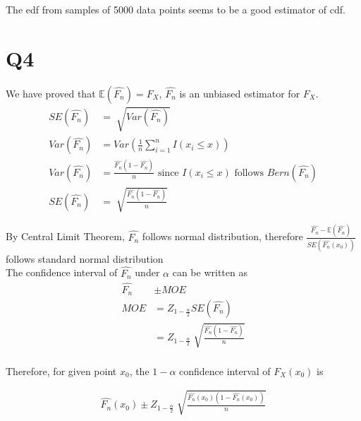 \documentclass[12pt,letterpaper]{article}
\let\hat\widehat
\begin{document}
\noindent The edf from samples of 5000 data points seems to be a good estimator of cdf.

\pagebreak
\section*{Q4}
We have proved that $\mathbb{E}(\hat{F_n}) = F_X$, $\hat{F_n}$ is an unbiased estimator for $F_X$. \\
\begin{align*}
SE(\hat{F_n}) &= \sqrt[]{ Var(\hat{F_n})} \\
Var(\hat{F_n}) &= Var(\frac{1}{n} \sum_{i=1}^{n} I(x_i \leq x)) \\
Var(\hat{F_n}) &= \frac{\hat{F_n }(1 - \hat{F_n})}{n} \text{ since } I(x_i \leq x) \text{ follows } Bern(\hat{F_n}) \\
SE(\hat{F_n}) &= \sqrt[]{\frac{\hat{F_n} (1 - \hat{F_n})}{n}}
\end{align*}

\noindent By Central Limit Theorem, $\hat{F_n}$ follows normal distribution, therefore 
$\frac{\hat{F_n} - \mathbb{E}(\hat{F_n}) }{SE(\hat{F_n}(x_0))}$ follows standard normal distribution\\

\noindent The confidence interval of $\hat{F_n}$ under $\alpha$ can be written as 
\begin{align*}
\hat{F_n} &\pm MOE \\
MOE &= Z_{1 - \frac{\alpha}{2}} SE(\hat{F_n}) \\
&= Z_{1 - \frac{\alpha}{2}} \sqrt[]{\frac{\hat{F_n} (1 - \hat{F_n})}{n}} \\
\end{align*}

\noindent Therefore, for given point $x_0$, the $1 - \alpha$ confidence interval of $F_X(x_0)$ is

\begin{align*}
\hat{F_n}(x_0) \pm  Z_{1 - \frac{\alpha}{2}} \sqrt[]{\frac{\hat{F_n}(x_0) (1 - \hat{F_n}(x_0))}{n}}
\end{align*}

\end{document}
